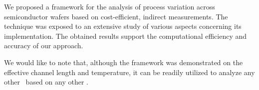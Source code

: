 We proposed a framework for the analysis of process variation across semiconductor wafers based on cost-efficient, indirect measurements.
The technique was exposed to an extensive study of various aspects concerning its implementation.
The obtained results support the computational efficiency and accuracy of our approach.

We would like to note that, although the framework was demonstrated on the effective channel length and temperature, it can be readily utilized to analyze any other \qois\ based on any other \qoms.
